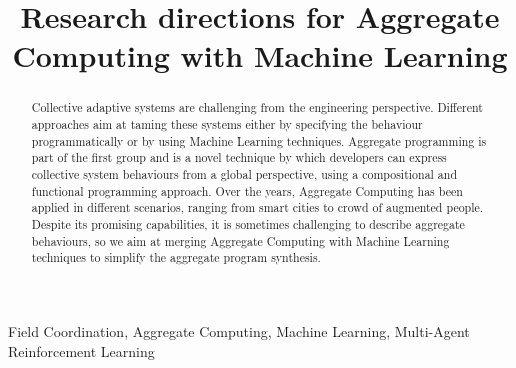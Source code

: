 \documentclass[conference]{IEEEtran}
\begin{document}
\title{Research directions for Aggregate Computing with Machine Learning}

\author{
}

\maketitle
\begin{abstract}
    Collective adaptive systems are challenging from the engineering perspective. 
%
    Different approaches aim at taming these systems either by specifying the behaviour programmatically or by using Machine Learning techniques.
%
    Aggregate programming is part of the first group and is a novel technique by which developers can express collective system behaviours from a global perspective, using a compositional and functional programming approach.
%
    Over the years, Aggregate Computing has been applied in different scenarios, ranging from smart cities to crowd of augmented people. 
%
    Despite its promising capabilities, it is sometimes challenging to describe aggregate behaviours, so we aim at merging Aggregate Computing with Machine Learning techniques to simplify the aggregate program synthesis.
\end{abstract}
\begin{IEEEkeywords}
Field Coordination, Aggregate Computing, Machine Learning, Multi-Agent Reinforcement Learning
\end{IEEEkeywords}
\end{document}
